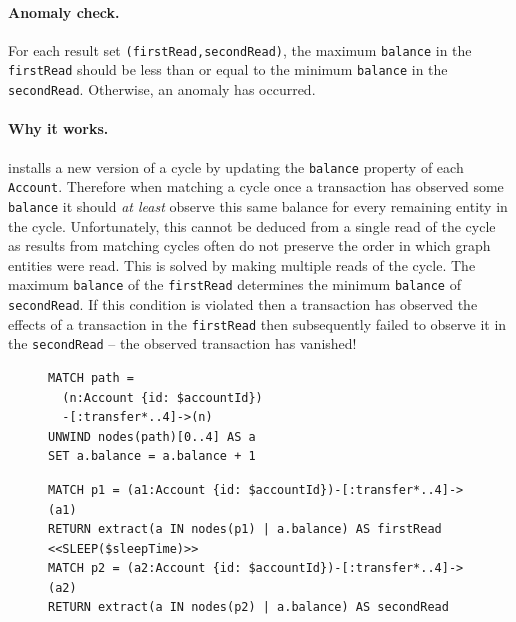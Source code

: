 \paragraph{Anomaly check.}
For each  result set \texttt{(firstRead,secondRead)}, 
the maximum \texttt{balance} in the \texttt{firstRead} should be less than or 
equal to the minimum \texttt{balance} in the \texttt{secondRead}. Otherwise, an 
 anomaly has occurred.

\paragraph{Why it works.}
 installs a new version of a cycle by updating the 
\texttt{balance} property of each \texttt{Account}. Therefore when matching a 
cycle once a transaction has observed some \texttt{balance} it should 
\emph{at least} observe this same balance for every remaining entity in the cycle.
Unfortunately, this cannot be deduced from a single read of the cycle as results
from matching cycles often do not preserve the order in which graph entities 
were read. This is solved by making multiple reads of the cycle. The maximum 
\texttt{balance} of the \texttt{firstRead} determines the minimum 
\texttt{balance} of \texttt{secondRead}. If this condition is violated then a 
transaction has observed the effects of a transaction in the \texttt{firstRead} 
then subsequently failed to observe it in the \texttt{secondRead} -- the 
observed transaction has vanished!

\begin{figure}[htb]
\centering
\begin{minipage}{0.33\linewidth}
\begin{lstlisting}[language=cypher,label=fig:otvfr1,caption=\tx{OTV/FR $T_\mathrm{W}$}.]
MATCH path = 
  (n:Account {id: $accountId})
  -[:transfer*..4]->(n)
UNWIND nodes(path)[0..4] AS a
SET a.balance = a.balance + 1
\end{lstlisting}
\end{minipage}
\quad
\begin{minipage}{0.60\linewidth}
\begin{lstlisting}[language=cypher,label=fig:otvfr2,caption=\tx{OTV/FR $T_\mathrm{R}$}.]
MATCH p1 = (a1:Account {id: $accountId})-[:transfer*..4]->(a1)
RETURN extract(a IN nodes(p1) | a.balance) AS firstRead
<<SLEEP($sleepTime)>>
MATCH p2 = (a2:Account {id: $accountId})-[:transfer*..4]->(a2)
RETURN extract(a IN nodes(p2) | a.balance) AS secondRead
\end{lstlisting}
\end{minipage}
\end{figure}


